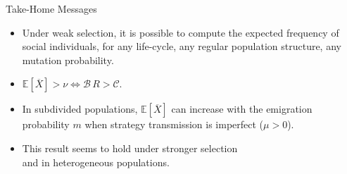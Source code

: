 \documentclass[aspectratio=169]{beamer}
\begin{document}
\def \wpic {0.3\textwidth}


\begin{frame}{Take-Home Messages}


\begin{center}
\begin{minipage}{0.9\textwidth}

\begin{itemize}
\item<+-> Under weak selection, it is
possible to compute the expected frequency of social
individuals, for any life-cycle, any regular population structure,  any mutation probability. 

\item<+-> $\mathbb{E}[\overline{X}]>\nu \Leftrightarrow \mathcal{B}\, R > \mathcal{C}$.

\item<+-> In subdivided populations, $\mathbb{E}[\overline{X}]$ can increase with the emigration probability $m$ when strategy transmission is imperfect ($\mu > 0$).  


\item<+-> This result seems to hold under stronger selection \\and in heterogeneous populations.
\end{itemize}
\end{minipage}
\end{center}


\end{frame}

\begin{frame}

\end{frame}
\end{document}
